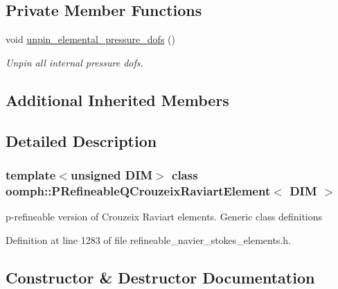 \subsection*{Private Member Functions}
\begin{DoxyCompactItemize}
\item 
void \hyperlink{classoomph_1_1PRefineableQCrouzeixRaviartElement_a686b52095b423b9d7173aa338e8a7d33}{unpin\+\_\+elemental\+\_\+pressure\+\_\+dofs} ()
\begin{DoxyCompactList}\small\item\em Unpin all internal pressure dofs. \end{DoxyCompactList}\end{DoxyCompactItemize}
\subsection*{Additional Inherited Members}


\subsection{Detailed Description}
\subsubsection*{template$<$unsigned D\+IM$>$\newline
class oomph\+::\+P\+Refineable\+Q\+Crouzeix\+Raviart\+Element$<$ D\+I\+M $>$}

p-\/refineable version of Crouzeix Raviart elements. Generic class definitions 

Definition at line 1283 of file refineable\+\_\+navier\+\_\+stokes\+\_\+elements.\+h.



\subsection{Constructor \& Destructor Documentation}
\mbox{\label{classoomph_1_1PRefineableQCrouzeixRaviartElement_a969688cb60fec675bb619d09456149e0}} 
